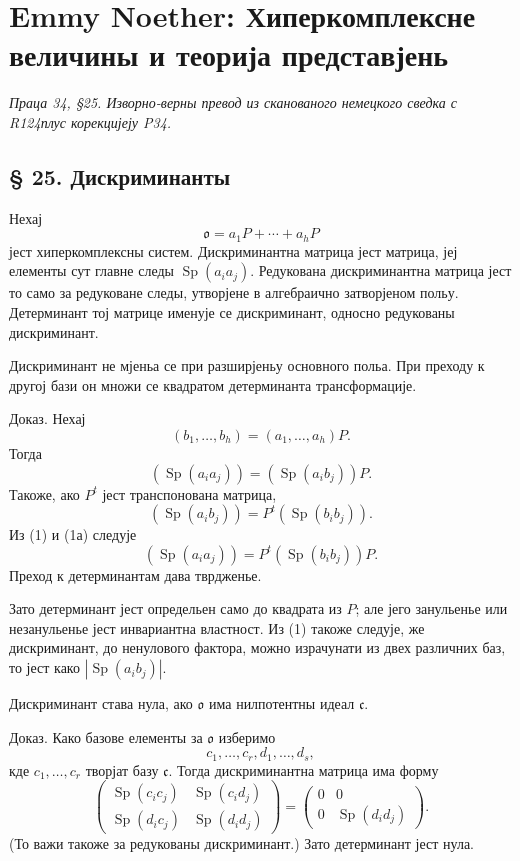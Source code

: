 ﻿\documentclass[11pt]{article}
\providecommand{\mo}{\mathfrak{o}}
\providecommand{\mc}{\mathfrak{c}}
\begin{document}
\section*{Emmy Noether: Хиперкомплексне величины и теорија представјень}
\emph{Праца 34, §25. Изворно-верны превод из сканованого немецкого сведка с R124плус корекцијеју P34.}

\subsection*{§ 25. Дискриминанты}

Нехај
\[
        \mo=a_1P+\cdots+a_hP
\]
јест хиперкомплексны систем. Дискриминантна матрица јест матрица, јеј елементы сут главне следы $\operatorname{Sp}(a_i a_j)$. Редукована дискриминантна матрица јест то само за редуковане следы, утворјене в алгебраично затворјеном польу. Детерминант тој матрице именује се дискриминант, односно редукованы дискриминант.

Дискриминант не мјеньа се при разширјеньу основного польа. При преходу к другој бази он множи се квадратом детерминанта трансформације.

Доказ. Нехај
\[
        (b_1,\ldots,b_h)=(a_1,\ldots,a_h)P.
\]
Тогда
\[
        (\operatorname{Sp}(a_i a_j))=(\operatorname{Sp}(a_i b_j))P.             \tag{1}
\]
Такоже, ако $P^t$ јест транспонована матрица,
\[
        (\operatorname{Sp}(a_i b_j))=P^t(\operatorname{Sp}(b_i b_j)).           \tag{1a}
\]
Из (1) и (1а) следује
\[
        (\operatorname{Sp}(a_i a_j))=P^t(\operatorname{Sp}(b_i b_j))P.
\]
Преход к детерминантам дава тврдженье.

Зато детерминант јест определьен само до квадрата из $P$; але јего занульенье или незанульенье јест инвариантна властност. Из (1) такоже следује, же дискриминант, до ненулового фактора, можно израчунати из двех различних баз, то јест како $|\operatorname{Sp}(a_i b_j)|$.

Дискриминант става нула, ако $\mo$ има нилпотентны идеал $\mc$.

Доказ. Како базове елементы за $\mo$ изберимо
\[
        c_1,\ldots,c_r,d_1,\ldots,d_s,
\]
кде $c_1,\ldots,c_r$ творјат базу $\mc$. Тогда дискриминантна матрица има форму
\[
        \begin{pmatrix}
        \operatorname{Sp}(c_i c_j)&\operatorname{Sp}(c_i d_j)\\
        \operatorname{Sp}(d_i c_j)&\operatorname{Sp}(d_i d_j)
        \end{pmatrix}
        =
        \begin{pmatrix}
        0&0\\
        0&\operatorname{Sp}(d_i d_j)
        \end{pmatrix}.
\]
(То важи такоже за редукованы дискриминант.) Зато детерминант јест нула.
\end{document}
